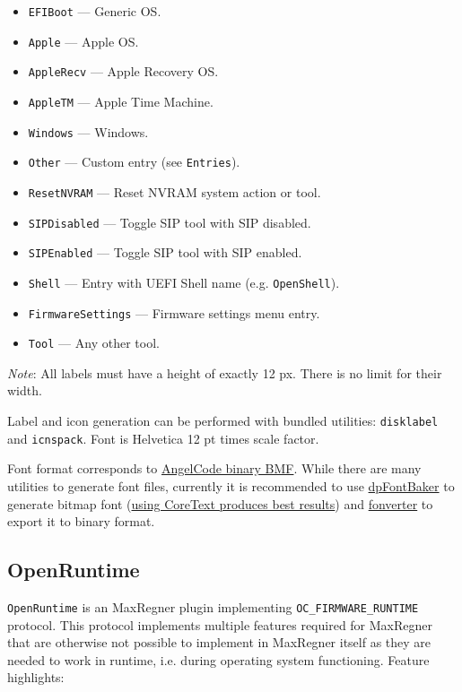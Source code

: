 \documentclass[]{article}
\makeatletter
\providecommand{\tightlist}{%
  \setlength{\itemsep}{0pt}\setlength{\parskip}{0pt}}
\renewcommand{\label}[1]{%
\zref@wrapper@immediate{\oldlabel{#1}}}  %
\makeatother
\begin{document}
\begin{itemize}
\tightlist
  \item \texttt{EFIBoot} --- Generic OS.
  \item \texttt{Apple} --- Apple OS.
  \item \texttt{AppleRecv} --- Apple Recovery OS.
  \item \texttt{AppleTM} --- Apple Time Machine.
  \item \texttt{Windows} --- Windows.
  \item \texttt{Other} --- Custom entry (see \texttt{Entries}).
  \item \texttt{ResetNVRAM} --- Reset NVRAM system action or tool.
  \item \texttt{SIPDisabled} --- Toggle SIP tool with SIP disabled.
  \item \texttt{SIPEnabled} --- Toggle SIP tool with SIP enabled.
  \item \texttt{Shell} --- Entry with UEFI Shell name (e.g. \texttt{OpenShell}).
  \item \texttt{FirmwareSettings} --- Firmware settings menu entry.
  \item \texttt{Tool} --- Any other tool.
\end{itemize}

\emph{Note}: All labels must have a height of exactly 12 px. There is no limit for their width.

Label and icon generation can be performed with bundled utilities: \texttt{disklabel} and
\texttt{icnspack}. Font is Helvetica 12 pt times scale factor.

Font format corresponds to \href{https://www.angelcode.com/products/bmfont}{AngelCode binary BMF}.
While there are many utilities to generate font files, currently it is recommended to use
\href{https://github.com/danpla/dpfontbaker}{dpFontBaker} to generate bitmap font
(\href{https://github.com/danpla/dpfontbaker/pull/1}{using CoreText produces best results})
and \href{https://github.com/usr-sse2/fonverter}{fonverter} to export it to binary format.

\subsection{OpenRuntime}\label{uefiruntime}

\texttt{OpenRuntime} is an MaxRegner plugin implementing \texttt{OC\_FIRMWARE\_RUNTIME} protocol.
This protocol implements multiple features required for MaxRegner that are otherwise not possible
to implement in MaxRegner itself as they are needed to work in runtime, i.e. during operating system
functioning. Feature highlights:
\end{document}
